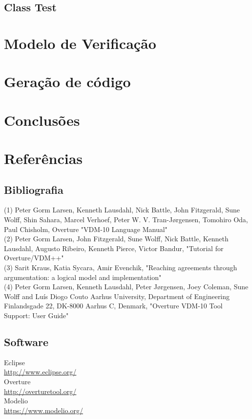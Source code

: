 \documentclass{article}
\begin{document}
\subsection{Class Test}

\section{Modelo de Verificação}

\section{Geração de código}

\section{Conclusões}
\section{Referências}
\subsection{Bibliografia}
\noindent
(1) Peter Gorm Larsen, Kenneth Lausdahl, Nick Battle, John Fitzgerald, Sune Wolff, Shin Sahara, Marcel Verhoef, Peter W. V. Tran-Jørgensen, Tomohiro Oda, Paul Chisholm, Overture "VDM-10 Language Manual"\\

\noindent
(2) Peter Gorm Larsen, John Fitzgerald, Sune Wolff, Nick Battle, Kenneth Lausdahl, Augusto Ribeiro, Kenneth Pierce, Victor Bandur, "Tutorial for Overture/VDM++"\\

\noindent
(3) Sarit Kraus, Katia Sycara, Amir Evenchik, "Reaching agreements through argumentation: a logical model and implementation"\\

\noindent
(4) Peter Gorm Larsen, Kenneth Lausdahl, Peter Jørgensen, Joey Coleman, Sune Wolff and Luís Diogo Couto Aarhus University, Department of Engineering Finlandsgade 22, DK-8000 Aarhus C, Denmark, "Overture VDM-10 Tool Support: User Guide"\\
\subsection{Software}

Eclipse \\
\vspace{3mm}\url{http://www.eclipse.org/} \\
Overture \\
\vspace{3mm}\url{http://overturetool.org/} \\
Modelio \\
\vspace{3mm}\url{https://www.modelio.org/} \\
\end{document}
